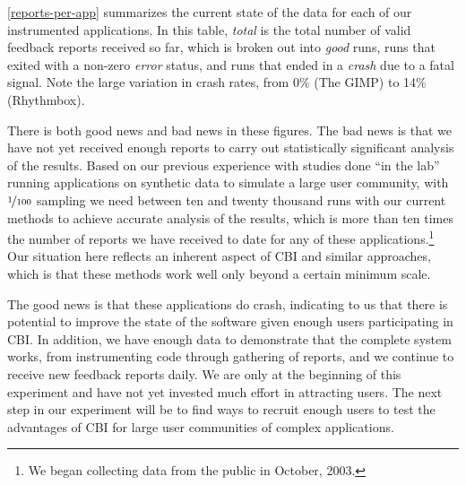\documentclass[10pt,twocolumn]{article}
\newcommand{\gimp}{The GIMP\xspace}
\newcommand{\rhythmbox}{Rhythmbox\xspace}
\begin{document}
\autoref{reports-per-app} summarizes the current state of the data for
each of our instrumented applications.  In this table, \emph{total} is
the total number of valid feedback reports received so far, which is
broken out into \emph{good} runs, runs that exited with a non-zero
\emph{error} status, and runs that ended in a \emph{crash} due to a
fatal signal.  Note the large variation in crash rates, from 0\%
(\gimp) to 14\% (\rhythmbox).

There is both good news and bad news in these figures.  The bad news
is that we have not yet received enough reports to carry out
statistically significant analysis of the results.  Based on our
previous experience with studies done ``in the lab'' running
applications on synthetic data to simulate a large user community,
with $\nicefrac{1}{100}$ sampling we need between ten and twenty thousand
runs with our current methods to achieve accurate analysis of
the results, which is more than ten times the number of reports we have
received to date for any of these applications.\footnote{We began
collecting data from the public in October, 2003.}  Our
situation here reflects an inherent aspect of CBI and similar
approaches, which is that these methods work well only beyond a
certain minimum scale.

The good news is that these applications do crash,
indicating to us that there is potential to improve the state
of the software given enough users participating in CBI\@.  In addition,
we have enough data to demonstrate that the complete system works, from
instrumenting code through gathering of reports, and we continue to
receive new feedback reports daily.  We are only at the beginning of this
experiment and have not yet invested much effort in attracting users. 
The next step in our experiment will be
to find ways to recruit enough users to test the advantages of CBI
for large user communities of complex applications.


\end{document}
